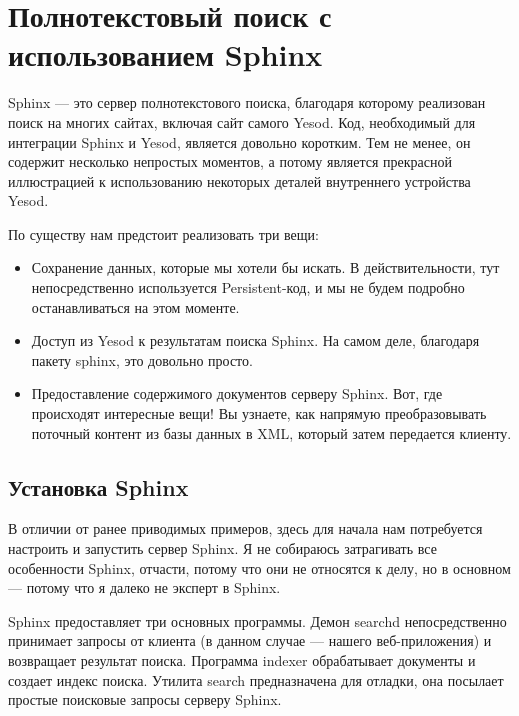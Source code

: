 \chapter{Полнотекстовый поиск с использованием Sphinx} %

Sphinx --- это сервер полнотекстового поиска, благодаря которому реализован поиск на многих сайтах, включая сайт самого Yesod. Код, необходимый для интеграции Sphinx и Yesod, является довольно коротким. Тем не менее, он содержит несколько непростых моментов, а потому является прекрасной иллюстрацией к использованию некоторых деталей внутреннего устройства Yesod. %

По существу нам предстоит реализовать три вещи: %

\begin{itemize}
  \item Сохранение данных, которые мы хотели бы искать. В действительности, тут непосредственно используется Persistent-код, и мы не будем подробно останавливаться на этом моменте. %
  \item Доступ из Yesod к результатам поиска Sphinx. На самом деле, благодаря пакету sphinx, это довольно просто.
  \item Предоставление содержимого документов серверу Sphinx. Вот, где происходят интересные вещи! Вы узнаете, как напрямую преобразовывать поточный контент из базы данных в XML, который затем передается клиенту. %
\end{itemize}

\section{Установка Sphinx} %

В отличии от ранее приводимых примеров, здесь для начала нам потребуется настроить и запустить сервер Sphinx. Я не собираюсь затрагивать все особенности Sphinx, отчасти, потому что они не относятся к делу, но в основном --- потому что я далеко не эксперт в Sphinx.

Sphinx предоставляет три основных программы. Демон searchd непосредственно принимает запросы от клиента (в данном случае --- нашего веб-приложения) и возвращает результат поиска. Программа indexer обрабатывает документы и создает индекс поиска. Утилита search предназначена для отладки, она посылает простые поисковые запросы серверу Sphinx.


